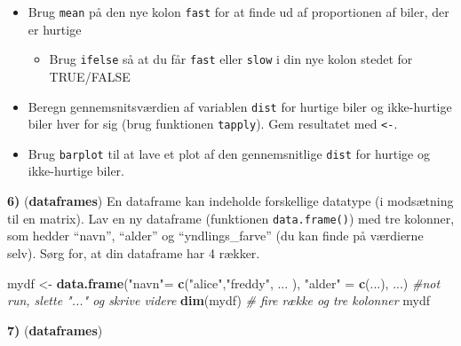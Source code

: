 \documentclass[
]{book}
\newenvironment{Shaded}{\begin{snugshade}}{\end{snugshade}}
\newcommand{\CommentTok}[1]{\textcolor[rgb]{0.56,0.35,0.01}{\textit{#1}}}
\newcommand{\DecValTok}[1]{\textcolor[rgb]{0.00,0.00,0.81}{#1}}
\newcommand{\FunctionTok}[1]{\textcolor[rgb]{0.13,0.29,0.53}{\textbf{#1}}}
\newcommand{\NormalTok}[1]{#1}
\newcommand{\OtherTok}[1]{\textcolor[rgb]{0.56,0.35,0.01}{#1}}
\newcommand{\SpecialCharTok}[1]{\textcolor[rgb]{0.81,0.36,0.00}{\textbf{#1}}}
\newcommand{\StringTok}[1]{\textcolor[rgb]{0.31,0.60,0.02}{#1}}
\providecommand{\tightlist}{%
  \setlength{\itemsep}{0pt}\setlength{\parskip}{0pt}}
\begin{document}
\begin{Shaded}
\end{Shaded}

\begin{itemize}
\tightlist
\item
  Brug \texttt{mean} på den nye kolon \texttt{fast} for at finde ud af proportionen af biler, der er hurtige

  \begin{itemize}
  \tightlist
  \item
    Brug \texttt{ifelse} så at du får \texttt{fast} eller \texttt{slow} i din nye kolon stedet for TRUE/FALSE
  \end{itemize}
\item
  Beregn gennemsnitsværdien af variablen \texttt{dist} for hurtige biler og ikke-hurtige biler hver for sig (brug funktionen \texttt{tapply}). Gem resultatet med \texttt{\textless{}-}.
\item
  Brug \texttt{barplot} til at lave et plot af den gennemsnitlige \texttt{dist} for hurtige og ikke-hurtige biler.
\end{itemize}

\textbf{6)} (\textbf{dataframes}) En dataframe kan indeholde forskellige datatype (i modsætning til en matrix). Lav en ny dataframe (funktionen \texttt{data.frame()}) med tre kolonner, som hedder ``navn'', ``alder'' og ``yndlings\_farve'' (du kan finde på værdierne selv). Sørg for, at din dataframe har 4 rækker.

\begin{Shaded}
\begin{Highlighting}[]
\NormalTok{mydf }\OtherTok{\textless{}{-}} \FunctionTok{data.frame}\NormalTok{(}\StringTok{"navn"}\OtherTok{=} \FunctionTok{c}\NormalTok{(}\StringTok{"alice"}\NormalTok{,}\StringTok{"freddy"}\NormalTok{, ... ), }\StringTok{"alder"} \OtherTok{=} \FunctionTok{c}\NormalTok{(...), ...) }\CommentTok{\#not run, slette "..." og skrive videre}
\FunctionTok{dim}\NormalTok{(mydf) }\CommentTok{\# fire række og tre kolonner}
\NormalTok{mydf}
\end{Highlighting}
\end{Shaded}

\textbf{7)} (\textbf{dataframes})
\end{document}
